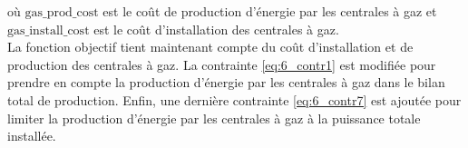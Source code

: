 \documentclass{article}
\begin{document}
\noindent où $\mathrm{gas\_prod\_cost}$ est le coût de production d'énergie par les centrales à gaz et $\mathrm{gas\_install\_cost}$ est le coût d'installation des centrales à gaz.\\
La fonction objectif tient maintenant compte du coût d'installation et de production des centrales à gaz. La contrainte \eqref{eq:6_contr1} est modifiée pour prendre en compte la production d'énergie par les centrales à gaz dans le bilan total de production. 
Enfin, une dernière contrainte \eqref{eq:6_contr7} est ajoutée pour limiter la production d'énergie par les centrales à gaz à la puissance totale installée.
\end{document}
